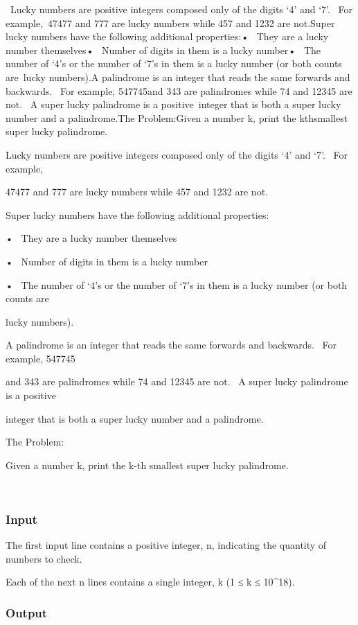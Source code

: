 

 Lucky numbers are positive integers composed only of the digits ‘4’ and ‘7’.  For example, 47477 and 777 are lucky numbers while 457 and 1232 are not.Super lucky numbers have the following additional properties:•  They are a lucky number themselves•  Number of digits in them is a lucky number•  The number of ‘4’s or the number of ‘7’s in them is a lucky number (or both counts are lucky numbers).A palindrome is an integer that reads the same forwards and backwards.  For example, 547745and 343 are palindromes while 74 and 12345 are not.  A super lucky palindrome is a positive integer that is both a super lucky number and a palindrome.The Problem:Given a number k, print the kthsmallest super lucky palindrome.

Lucky numbers are positive integers composed only of the digits ‘4’ and ‘7’.  For example, 

47477 and 777 are lucky numbers while 457 and 1232 are not.

Super lucky numbers have the following additional properties:

•  They are a lucky number themselves

•  Number of digits in them is a lucky number

•  The number of ‘4’s or the number of ‘7’s in them is a lucky number (or both counts are 

lucky numbers).

A palindrome is an integer that reads the same forwards and backwards.  For example, 547745

and 343 are palindromes while 74 and 12345 are not.  A super lucky palindrome is a positive 

integer that is both a super lucky number and a palindrome.

The Problem:

Given a number k, print the k-th smallest super lucky palindrome.

 

\subsubsection{Input}

The first input line contains a positive integer, n, indicating the quantity of numbers to check. 

Each of the next n lines contains a single integer, k (1 ≤ k ≤ 10\textasciicircum18).

\subsubsection{Output}

